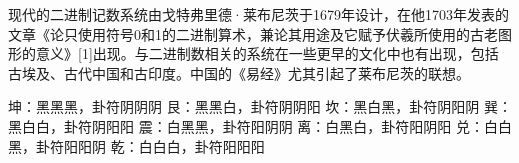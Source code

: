 \documentclass[main.tex]{subfiles}
\begin{document}
现代的二进制记数系统由戈特弗里德·莱布尼茨于1679年设计，在他1703年发表的文章《论只使用符号0和1的二进制算术，兼论其用途及它赋予伏羲所使用的古老图形的意义》[1]出现。与二进制数相关的系统在一些更早的文化中也有出现，包括古埃及、古代中国和古印度。中国的《易经》尤其引起了莱布尼茨的联想。

坤：黑黑黑，卦符阴阴阴
艮：黑黑白，卦符阴阴阳
坎：黑白黑，卦符阴阳阴
巽：黑白白，卦符阴阳阳
震：白黑黑，卦符阳阴阴
离：白黑白，卦符阳阴阳
兑：白白黑，卦符阳阳阴
乾：白白白，卦符阳阳阳
\end{document}
